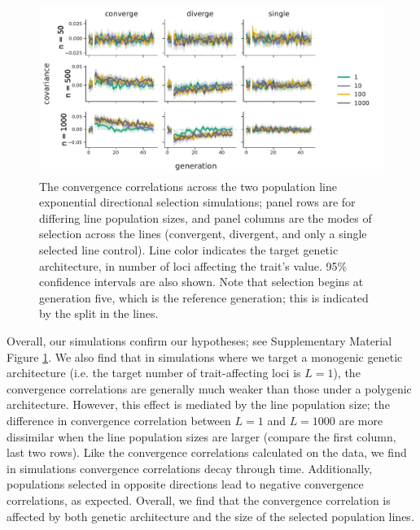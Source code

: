 \documentclass[11pt]{article}
\begin{document}
\begin{figure}[!ht]
  \centering
  \includegraphics[width=\textwidth]{figures/fig-convergence-corrs.pdf}

  \caption{The convergence correlations across the two population line
    exponential directional selection simulations; panel rows are for differing
    line population sizes, and panel columns are the modes of selection across
    the lines (convergent, divergent, and only a single selected line control).
    Line color indicates the target genetic architecture, in number of loci
    affecting the trait's value. 95\% confidence intervals are also shown. Note
    that selection begins at generation five, which is the reference
    generation; this is indicated by the split in the lines.}

  \label{suppfig:convergence-corrs}
\end{figure}

Overall, our simulations confirm our hypotheses; see Supplementary Material
Figure \ref{suppfig:convergence-corrs}. We also find that in simulations where
we target a monogenic genetic architecture (i.e. the target number of
trait-affecting loci is $L=1$), the convergence correlations are generally much
weaker than those under a polygenic architecture. However, this effect is
mediated by the line population size; the difference in convergence correlation
between $L = 1$ and $L = 1000$ are more dissimilar when the line population
sizes are larger (compare the first column, last two rows). Like the
convergence correlations calculated on the \textcite{Barghi2019-qy} data, we
find in simulations convergence correlations decay through time. Additionally,
populations selected in opposite directions lead to negative convergence
correlations, as expected. Overall, we find that the convergence correlation is
affected by both genetic architecture and the size of the selected population
lines.
\end{document}
